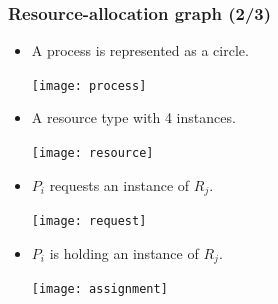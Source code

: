 \documentclass[CJKutf8,xcolor=pdftex,dvipsnames,table]{beamer}
\begin{document}
\begin{CJK*}{UTF8}{song}
  \begin{frame}
  \frametitle{Resource-allocation graph (2/3)} \pause
  \begin{itemize}
  \item{A process is represented as a circle.} \pause
    \begin{center}
      \texttt{[image: process]} \pause
    \end{center}
  \item{A resource type with 4 instances.} \pause
    \begin{center}
      \texttt{[image: resource]} \pause
    \end{center}
  \item{$P_i$ requests an instance of $R_j$.} \pause
    \begin{center}
      \texttt{[image: request]} \pause
    \end{center}
  \item{$P_i$ is holding an instance of $R_j$.}
    \begin{center}
      \texttt{[image: assignment]}
    \end{center}
  \end{itemize}
  \end{frame}
  

\end{CJK*}
\end{document}
